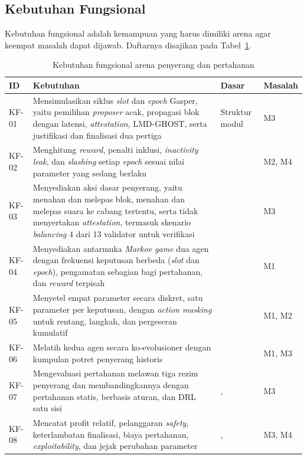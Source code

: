 \subsection{Kebutuhan Fungsional}
\label{subsec:kebutuhan_fungsional}
Kebutuhan fungsional adalah kemampuan yang harus dimiliki arena agar keempat masalah dapat dijawab. Daftarnya disajikan pada Tabel~\ref{tab:kebutuhan_fungsional}.

\begin{table}[htbp]
\centering
\caption{Kebutuhan fungsional arena penyerang dan pertahanan}
\label{tab:kebutuhan_fungsional}
\small
\begin{tabular}{|p{1.1cm}|p{6.6cm}|p{3.0cm}|p{1.5cm}|}
\hline
\textbf{ID} & \textbf{Kebutuhan} & \textbf{Dasar} & \textbf{Masalah} \\
\hline
KF-01 & Mensimulasikan siklus \textit{slot} dan \textit{epoch} Gasper, yaitu pemilihan \textit{proposer} acak, propagasi blok dengan latensi, \textit{attestation}, LMD-GHOST, serta justifikasi dan finalisasi dua pertiga & Struktur modul \textcite{laneve2025stochastic} & M3 \\
\hline
KF-02 & Menghitung \textit{reward}, penalti inklusi, \textit{inactivity leak}, dan \textit{slashing} setiap \textit{epoch} sesuai nilai parameter yang sedang berlaku & \textcite{laneve2025stochastic} & M2, M4 \\
\hline
KF-03 & Menyediakan aksi dasar penyerang, yaitu menahan dan melepas blok, menahan dan melepas suara ke cabang tertentu, serta tidak menyertakan \textit{attestation}, termasuk skenario \textit{balancing} 4 dari 13 validator untuk verifikasi & \textcite{laneve2025stochastic} & M3 \\
\hline
KF-04 & Menyediakan antarmuka \textit{Markov game} dua agen dengan frekuensi keputusan berbeda (\textit{slot} dan \textit{epoch}), pengamatan sebagian bagi pertahanan, dan \textit{reward} terpisah & \textcite{wushishi2026coadam} & M1 \\
\hline
KF-05 & Menyetel empat parameter secara diskret, satu parameter per keputusan, dengan \textit{action masking} untuk rentang, langkah, dan pergeseran kumulatif & \textcite{skowronski2026adaptive} & M1, M2 \\
\hline
KF-06 & Melatih kedua agen secara ko-evolusioner dengan kumpulan potret penyerang historis & \textcite{wushishi2026coadam} & M1, M3 \\
\hline
KF-07 & Mengevaluasi pertahanan melawan tiga rezim penyerang dan membandingkannya dengan pertahanan statis, berbasis aturan, dan DRL satu sisi & \textcite{wushishi2026coadam}, \textcite{skowronski2026adaptive} & M3 \\
\hline
KF-08 & Mencatat profit relatif, pelanggaran \textit{safety}, keterlambatan finalisasi, biaya pertahanan, \textit{exploitability}, dan jejak perubahan parameter & \textcite{skowronski2026adaptive}, \textcite{wushishi2026coadam} & M3, M4 \\
\hline
\end{tabular}
\end{table}

